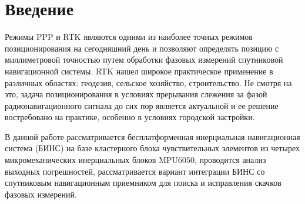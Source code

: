 \section {Введение}


Режимы PPP и RTK являются одними из наиболее точных режимов позиционирования на сегодняшний день и позволяют  
определять позицию с миллиметровой точностью путем обработки фазовых измерений спутниковой навигационной системы. 
RTK нашел широкое практическое применение в различных областях: геодезия, сельское хозяйство, строительство. Не смотря на это, задача 
позиционирования в условиях прерывания слежения за фазой радионавигационного сигнала до сих пор является актуальной и ее 
решение востребовано на практике, особенно в условиях городской застройки. 


В данной работе рассматривается бесплатформенная инерциальная навигационная система (БИНС) на базе кластерного блока чувствительных элементов из четырех микромеханических инерциальных блоков MPU6050, проводится анализ выходных погрешностей, рассматривается вариант интеграции БИНС со спутниковым навигационным приемником для поиска и исправления скачков фазовых измерений.  
 